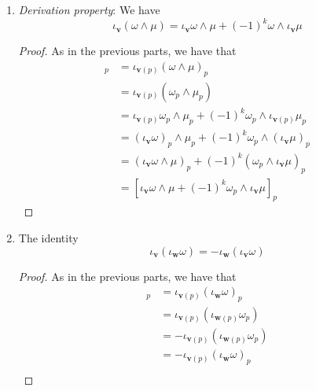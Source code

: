 \documentclass[../psets.tex]{subfiles}
\begin{document}
\begin{enumerate}[label={\textbf{2.5.\roman*.}}]
\begin{enumerate}
\begin{proof}
\begin{align*}
                &= [\iota_{\bm{v}}\omega]_p+[\iota_{\bm{w}}\omega]_p\\
                &= [\iota_{\bm{v}}\omega+\iota_{\bm{w}}\omega]_p
            \end{align*}
        \end{proof}
        \item \emph{Derivation property}: We have
        \begin{equation*}
            \iota_{\bm{v}}(\omega\wedge\mu) = \iota_{\bm{v}}\omega\wedge\mu+(-1)^k\omega\wedge\iota_{\bm{v}}\mu
        \end{equation*}
        \begin{proof}
            As in the previous parts, we have that
            \begin{align*}
                [\iota_{\bm{v}}(\omega\wedge\mu)]_p &= \iota_{\bm{v}(p)}(\omega\wedge\mu)_p\\
                &= \iota_{\bm{v}(p)}(\omega_p\wedge\mu_p)\\
                &= \iota_{\bm{v}(p)}\omega_p\wedge\mu_p+(-1)^k\omega_p\wedge\iota_{\bm{v}(p)}\mu_p\\
                &= (\iota_{\bm{v}}\omega)_p\wedge\mu_p+(-1)^k\omega_p\wedge(\iota_{\bm{v}}\mu)_p\\
                &= (\iota_{\bm{v}}\omega\wedge\mu)_p+(-1)^k(\omega_p\wedge\iota_{\bm{v}}\mu)_p\\
                &= [\iota_{\bm{v}}\omega\wedge\mu+(-1)^k\omega_p\wedge\iota_{\bm{v}}\mu]_p
            \end{align*}
        \end{proof}
        \item The identity
        \begin{equation*}
            \iota_{\bm{v}}(\iota_{\bm{w}}\omega) = -\iota_{\bm{w}}(\iota_{\bm{v}}\omega)
        \end{equation*}
        \begin{proof}
            As in the previous parts, we have that
            \begin{align*}
                [\iota_{\bm{v}}(\iota_{\bm{w}}\omega)]_p &= \iota_{\bm{v}(p)}(\iota_{\bm{w}}\omega)_p\\
                &= \iota_{\bm{v}(p)}(\iota_{\bm{w}(p)}\omega_p)\\
                &= -\iota_{\bm{v}(p)}(\iota_{\bm{w}(p)}\omega_p)\\
                &= -\iota_{\bm{v}(p)}(\iota_{\bm{w}}\omega)_p\\

\end{align*}
\end{proof}
\end{enumerate}
\end{enumerate}
\end{document}
